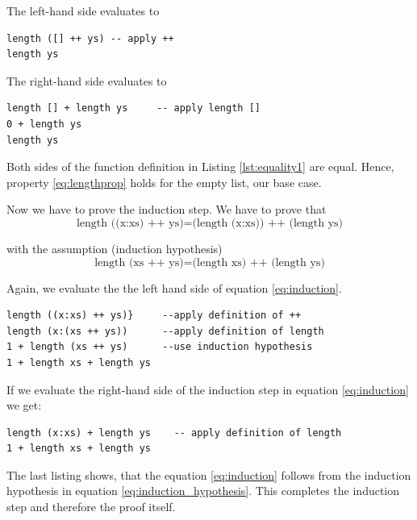 \documentclass[twoside, a4paper, 12pt]{article}
\begin{document}
The left-hand side evaluates to
\begin{program}
\begin{verbatim}
length ([] ++ ys) -- apply ++
length ys
\end{verbatim}
\end{program}

The right-hand side evaluates to 
\begin{program}
\begin{verbatim}
length [] + length ys     -- apply length []
0 + length ys
length ys
\end{verbatim}
\end{program}

Both sides of the function definition in Listing \ref{lst:equality1} are equal. Hence, property \ref{eq:lengthprop} holds for the empty list, our base case.

Now we have to prove the induction step. We have to prove that
\begin{equation}
  \label{eq:induction}
    \text{length ((x:xs) ++ ys)} = \text{(length (x:xs)) ++ (length ys)}
\end{equation}

with the assumption (induction hypothesis)
\begin{equation}
  \label{eq:induction_hypothesis}
      \text{length (xs ++ ys)} = \text{(length xs) ++ (length ys)}
\end{equation}

Again, we evaluate the the left hand side of equation \ref{eq:induction}.

\begin{program}
\begin{verbatim}
length ((x:xs) ++ ys)}     --apply definition of ++
length (x:(xs ++ ys))      --apply definition of length
1 + length (xs ++ ys)      --use induction hypothesis
1 + length xs + length ys
\end{verbatim}
\end{program}

If we evaluate the right-hand side of the induction step in equation  \ref{eq:induction} we get:
\begin{program}
\begin{verbatim}
length (x:xs) + length ys    -- apply definition of length
1 + length xs + length ys
\end{verbatim}
\end{program}

The last listing shows, that the equation \ref{eq:induction} follows from the induction hypothesis in equation \ref{eq:induction_hypothesis}. This completes the induction step and therefore the proof itself.
\end{document}
